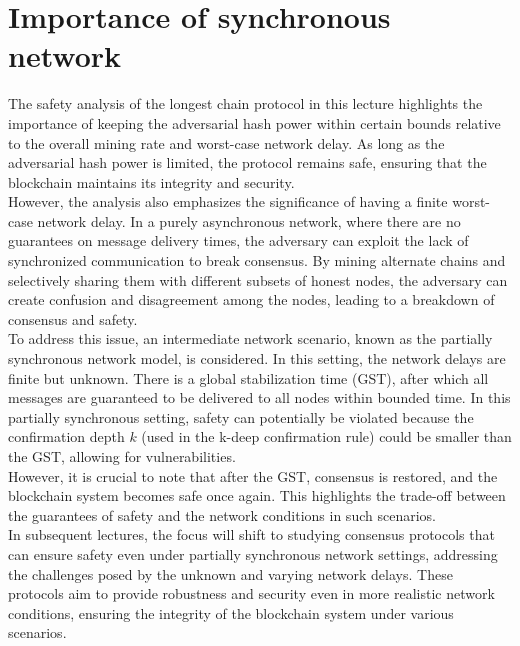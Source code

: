 \section{Importance of synchronous network}
The safety analysis of the longest chain protocol in this lecture highlights the importance of keeping the adversarial hash power within certain bounds relative to the overall mining rate and worst-case network delay. As long as the adversarial hash power is limited, the protocol remains safe, ensuring that the blockchain maintains its integrity and security.\\
However, the analysis also emphasizes the significance of having a finite worst-case network delay. In a purely asynchronous network, where there are no guarantees on message delivery times, the adversary can exploit the lack of synchronized communication to break consensus. By mining alternate chains and selectively sharing them with different subsets of honest nodes, the adversary can create confusion and disagreement among the nodes, leading to a breakdown of consensus and safety.\\
To address this issue, an intermediate network scenario, known as the partially synchronous network model, is considered. In this setting, the network delays are finite but unknown. There is a global stabilization time (GST), after which all messages are guaranteed to be delivered to all nodes within bounded time. In this partially synchronous setting, safety can potentially be violated because the confirmation depth $k$ (used in the k-deep confirmation rule) could be smaller than the GST, allowing for vulnerabilities.\\
However, it is crucial to note that after the GST, consensus is restored, and the blockchain system becomes safe once again. This highlights the trade-off between the guarantees of safety and the network conditions in such scenarios.\\
In subsequent lectures, the focus will shift to studying consensus protocols that can ensure safety even under partially synchronous network settings, addressing the challenges posed by the unknown and varying network delays. These protocols aim to provide robustness and security even in more realistic network conditions, ensuring the integrity of the blockchain system under various scenarios.
